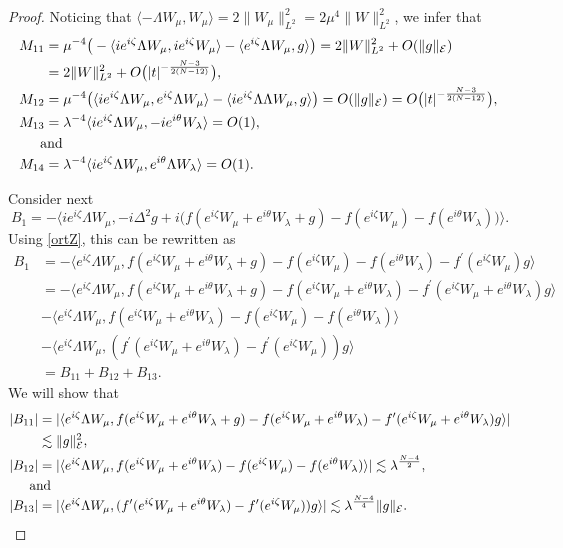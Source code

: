 \documentclass[a4paper,two-side,10pt]{amsart}
\numberwithin{equation}{section}
\begin{document}
\begin{proof}
Noticing that $\langle -\Lambda W_\mu ,W_\mu \rangle =2 \|W_\mu\|_{L^2}^2 =2 \mu^4  \|W\|_{L^2}^2$, we infer that
\begin{align*}
M_{11} &= \mu^{-4}\big(- \langle i e^{i\zeta} \Lambda W_\mu , i e^{i\zeta} W_\mu \rangle - \langle e^{i\zeta} \Lambda W_\mu ,g \rangle\big)  =2 \|W\|_{L^2}^2 + O(\|g\|_{\mathcal{E}})\\
&= 2 \|W\|_{L^2}^2 +O\big(|t|^{-\frac{N-3}{2(N-12)}}\big),\\
M_{12}&= \mu^{-4}  \big(\langle  i e^{i\zeta} \Lambda W_\mu , e^{i\zeta} \Lambda W_\mu\rangle - \langle i e^{i\zeta} \Lambda \Lambda W_\mu ,g \rangle\big) = O(\|g\|_{\mathcal{E}})=O\big(|t|^{-\frac{N-3}{2(N-12)}}\big),\\
M_{13}&= \lambda^{-4}  \langle ie^{i\zeta} \Lambda W_\mu ,-i e^{i\theta} W_\lambda \rangle  =O(1),\\
\noalign{and}
M_{14}&= \lambda^{-4}  \langle ie^{i\zeta} \Lambda W_\mu ,e^{i\theta} \Lambda W_\lambda \rangle =O(1). 
\end{align*}
 
Consider next
$$B_1 =-  \big\langle i e^{i\zeta} \Lambda W_\mu , -i \Delta^2 g +i \big(f(e^{i\zeta} W_\mu +e^{i\theta} W_\lambda +g) - f(e^{i\zeta} W_\mu) - f(e^{i\theta} W_\lambda)\big) \big\rangle .$$
Using \eqref{ortZ}, this can be rewritten as
\begin{align*}
B_1 &= - \langle   e^{i\zeta} \Lambda W_\mu ,  f(e^{i\zeta} W_\mu +e^{i\theta} W_\lambda +g) - f(e^{i\zeta} W_\mu) - f(e^{i\theta} W_\lambda) - f^\prime (e^{i\zeta} W_\mu) g \rangle \\
&=-\langle   e^{i\zeta} \Lambda W_\mu ,  f(e^{i\zeta} W_\mu +e^{i\theta} W_\lambda +g) - f(e^{i\zeta} W_\mu +e^{i\theta} W_\lambda) - f^\prime (e^{i\zeta} W_\mu  + e^{i\theta} W_\lambda) g \rangle \\
 &-  \langle   e^{i\zeta} \Lambda W_\mu , f(e^{i\zeta} W_\mu +e^{i\theta} W_\lambda ) - f(e^{i\zeta} W_\mu )- f(e^{i\theta} W_\lambda) \rangle\\
&- \langle   e^{i\zeta} \Lambda W_\mu ,  (f^\prime (e^{i\zeta} W_\mu +e^{i\theta} W_\lambda ) - f^\prime (e^{i\zeta} W_\mu ))g \rangle\\
&= B_{11}+B_{12}+B_{13} .
\end{align*}
We will show that
\begin{align*}
|B_{11}|&= |\langle   e^{i\zeta} \Lambda W_\mu ,  f(e^{i\zeta} W_\mu +e^{i\theta} W_\lambda +g) - f(e^{i\zeta} W_\mu +e^{i\theta} W_\lambda) - f^\prime (e^{i\zeta} W_\mu + e^{i\theta} W_\lambda) g \rangle |\\
& \lesssim \|g\|_{\mathcal{E}}^2,\\
|B_{12} |&= |\langle   e^{i\zeta} \Lambda W_\mu ,  f(e^{i\zeta} W_\mu +e^{i\theta} W_\lambda ) - f(e^{i\zeta} W_\mu )- f(e^{i\theta} W_\lambda) \rangle | \lesssim \lambda^{\frac{N-4}{2}},\\
\noalign{and}
|B_{13}|&= |\langle   e^{i\zeta} \Lambda W_\mu ,  (f^\prime (e^{i\zeta} W_\mu +e^{i\theta} W_\lambda ) - f^\prime (e^{i\zeta} W_\mu ))g \rangle | \lesssim \lambda^{\frac{N-4}{4}} \|g\|_{\mathcal{E}} .
\end{align*}


\end{proof}
\end{document}
